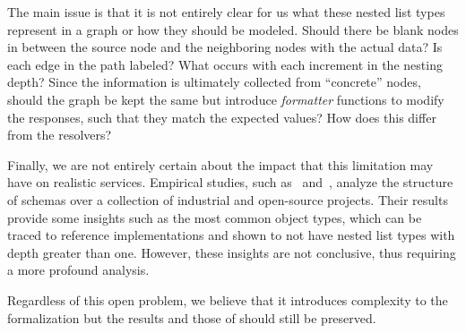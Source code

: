 The main issue is that it is not entirely clear for us what these nested list types represent in a graph or how they should be modeled. 
Should there be blank nodes in between the source node and the neighboring nodes with the actual data? Is each edge in the path labeled?
What occurs with each increment in the nesting depth? Since the information is ultimately collected from ``concrete'' nodes, should the graph be kept the same 
but introduce \textit{formatter} functions to modify the responses, such that they match the expected values? How does this differ from the \gql resolvers?

Finally, we are not entirely certain about the impact that this limitation may have on realistic \gql services. 
Empirical studies, such as~\cite{empiricalgql} and~\cite{empiricalapi}, analyze the structure of \gql schemas 
over a collection of industrial and open-source projects. Their results provide some insights such as the most 
common object types, which can be traced to reference implementations and shown to not have nested list types 
with depth greater than one. However, these insights are not conclusive, thus requiring a more profound analysis. 

Regardless of this open problem, we believe that it introduces complexity to the formalization but the results and those of \HP should still be preserved.



